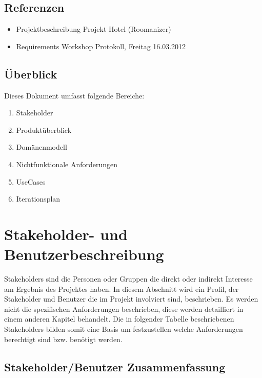 \documentclass[10pt,a4paper,titlepage]{article}
\begin{document}
\subsection{Referenzen}
\begin{itemize}
	\item Projektbeschreibung Projekt Hotel (Roomanizer) 
	\item Requirements Workshop Protokoll, Freitag 16.03.2012
\end{itemize}

\subsection{Überblick}
Dieses Dokument umfasst folgende Bereiche:
\begin{enumerate}
	\item Stakeholder
        \item Produktüberblick
	\item Domänenmodell
        \item Nichtfunktionale Anforderungen
	\item UseCases
        \item Iterationsplan 
\end{enumerate}

\section{Stakeholder- und Benutzerbeschreibung}
Stakeholders sind die Personen oder Gruppen die direkt oder indirekt Interesse am Ergebnis des Projektes haben. In diesem Abschnitt wird ein Profil, der Stakeholder und Benutzer die im Projekt involviert sind, beschrieben. Es werden nicht die spezifischen Anforderungen beschrieben, diese werden detailliert in einem anderen Kapitel behandelt. Die in folgender Tabelle beschriebenen Stakeholders bilden somit eine Basis um festzustellen welche Anforderungen berechtigt sind bzw. benötigt werden. 
\subsection{Stakeholder\slash{}Benutzer Zusammenfassung}
\end{document}
